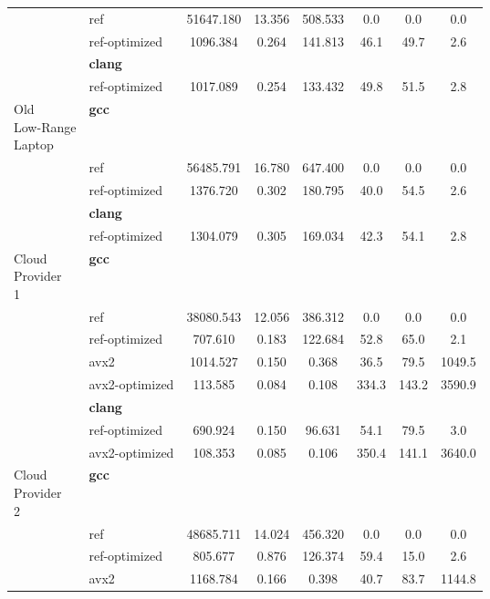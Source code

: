 \begin{table}
\begin{tabularx}{\linewidth}{l l c c c c c c}
          & ref & 51647.180 & 13.356 & 508.533 & 0.0 & 0.0 & 0.0\\
          & ref-optimized & 1096.384 & 0.264 & 141.813 & 46.1 & 49.7 & 2.6\\
          & \textbf{clang} & & & & & \\
          & ref-optimized & 1017.089 & 0.254 & 133.432 & 49.8 & 51.5 & 2.8\\
          \midrule
          \multirowcell{5}{Old\\ Low-Range\\ Laptop}
          & \textbf{gcc} & & & & & \\
          & ref & 56485.791 & 16.780 & 647.400 & 0.0 & 0.0 & 0.0\\
          & ref-optimized & 1376.720 & 0.302 & 180.795 & 40.0 & 54.5 & 2.6\\
          & \textbf{clang} & & & & & \\
          & ref-optimized & 1304.079 & 0.305 & 169.034 & 42.3 & 54.1 & 2.8\\
          \midrule
          \multirowcell{8}{Cloud\\ Provider\\ 1}
          & \textbf{gcc} & & & & & \\
          & ref & 38080.543 & 12.056 & 386.312 & 0.0 & 0.0 & 0.0\\
          & ref-optimized & 707.610 & 0.183 & 122.684 & 52.8 & 65.0 & 2.1\\
          & avx2 & 1014.527 & 0.150 & 0.368 & 36.5 & 79.5 & 1049.5\\
          & avx2-optimized & 113.585 & 0.084 & 0.108 & 334.3 & 143.2 & 3590.9\\
          & \textbf{clang} & & & & & \\
          & ref-optimized & 690.924 & 0.150 & 96.631 & 54.1 & 79.5 & 3.0\\
          & avx2-optimized & 108.353 & 0.085 & 0.106 & 350.4 & 141.1 & 3640.0\\
          \midrule
          \multirowcell{8}{Cloud\\ Provider\\ 2}
          & \textbf{gcc} & & & & & \\
          & ref & 48685.711 & 14.024 & 456.320 & 0.0 & 0.0 & 0.0\\
          & ref-optimized & 805.677 & 0.876 & 126.374 & 59.4 & 15.0 & 2.6\\
          & avx2 & 1168.784 & 0.166 & 0.398 & 40.7 & 83.7 & 1144.8\\

\end{tabularx}
\end{table}
